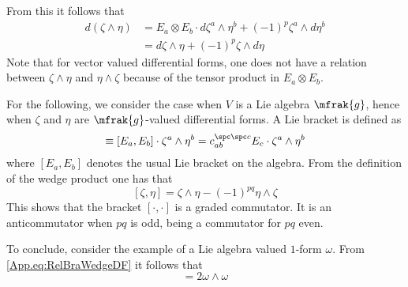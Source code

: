 \documentclass[10pt,reqno]{amsart}
\numberwithin{equation}{section}
\begin{document}
From this it follows that
%
\begin{equation}
	\begin{split}
		d(\zeta \wedge \eta) &= E_a \otimes E_b \cdot
		d\zeta^a \wedge \eta^b + (-1)^p \zeta^a \wedge d\eta^b \\
		&= d\zeta \wedge \eta + (-1)^p \zeta \wedge d\eta
	\end{split}
\end{equation}
%
Note that for vector valued differential forms, one does not have 
a relation between $\zeta \wedge \eta$ and $\eta \wedge \zeta$ 
because of the tensor product in $E_a \otimes E_b$.

\blankline
For the following, we consider the case when $V$ is a Lie algebra 
$\mfrak{g}$, hence when $\zeta$ and $\eta$ are $\mfrak{g}$-valued 
differential forms. A Lie bracket is defined as
%
\begin{equation}
	[\zeta, \eta] \equiv [E_a,E_b] \cdot
	\zeta^a \wedge \eta^b
	= c_{ab}^{\spc\spc c}E_c \cdot
	\zeta^a \wedge \eta^b
\end{equation}
%
where $[E_a,E_b]$ denotes the usual Lie bracket on the algebra.
From the definition of the wedge product one has that
%
\begin{equation}\label{App.eq:RelBraWedgeDF}
	[\zeta, \eta] = \zeta \wedge \eta
	-(-1)^{pq} \eta \wedge \zeta
\end{equation}
%
This shows that the bracket $[\cdot, \cdot]$ is a graded 
commutator. It is an anticommutator when $pq$ is odd, being a 
commutator for $pq$ even.

To conclude, consider the example of a Lie algebra valued 
$1$-form $\omega$. From \eqref{App.eq:RelBraWedgeDF} it follows 
that
%
\begin{equation}
	[\omega,\omega] = 2 \omega \wedge \omega
\end{equation}








\end{document}

